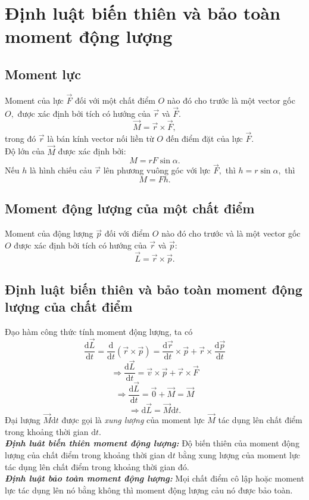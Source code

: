 \section{Định luật biến thiên và bảo toàn moment động lượng}
\subsection{Moment lực}
Moment của lực $\overrightarrow{F}$ đối với một chất điểm $O$ nào đó cho trước là một vector gốc $O,$ được xác định bởi tích có hướng của $\overrightarrow{r}$ và $\overrightarrow{F}.$ 
$$\overrightarrow{M} = \overrightarrow{r} \times \overrightarrow{F},$$
trong đó $\overrightarrow{r}$ là bán kính vector nối liền từ $O$ đến điểm đặt của lực $\overrightarrow{F}.$\\
Độ lớn của $\overrightarrow{M}$ được xác định bởi:
$$M = r F \sin \alpha.$$
Nếu $h$ là hình chiếu cảu $\overrightarrow{r}$ lên phương vuông góc với lực $\overrightarrow{F},$ thì $h = r \sin \alpha,$ thì
$$M = Fh.$$
\subsection{Moment động lượng của một chất điểm}
Moment của động lượng $\overrightarrow{p}$ đối với điểm $O$ nào đó cho trước và là một vector gốc $O$ được xác định bởi tích có hướng của $\overrightarrow{r}$ và $\overrightarrow{p}:$
$$ \overrightarrow{L} = \overrightarrow{r} \times \overrightarrow{p}.$$
\subsection{Định luật biến thiên và bảo toàn moment động lượng của chất điểm}
Đạo hàm công thức tính moment động lượng, ta có
$$\frac{{\mathrm{d} \overrightarrow L }}{\mathrm{d}t} = \frac{{\mathrm{d}}}{\mathrm{d}t}\left( {\overrightarrow r  \times  \overrightarrow p } \right) = \frac{{\mathrm{d}\overrightarrow r }}{\mathrm{d}t} \times \overrightarrow p  + \overrightarrow r  \times \frac{{\mathrm{d}\overrightarrow p }}{\mathrm{d}t}$$
$$ \Rightarrow \frac{{\mathrm{d}\overrightarrow L }}{\mathrm{d}t} = \overrightarrow v  \times \overrightarrow p  + \overrightarrow r  \times \overrightarrow F $$
$$ \Rightarrow \frac{{\mathrm{d}\overrightarrow L }}{\mathrm{d}t} = \overrightarrow 0  + \overrightarrow M  = \overrightarrow M $$
$$\Rightarrow \mathrm{d}\overrightarrow{L} = \overrightarrow{M}\mathrm{d}t.$$
Đại lượng $\overrightarrow{M}\mathrm{d}t$ được gọi là \textit{xung lượng} của moment lực $\overrightarrow{M}$ tác dụng lên chất điểm trong khoảng thời gian $\mathrm{d}t.$\\
\textbf{\textit{Định luât biến thiên moment động lượng:}} Độ biến thiên của moment động lượng của chất điểm trong khoảng thời gian $\mathrm{d}t$ bằng xung lượng của moment lực tác dụng lên chất điểm trong khoảng thời gian đó.\\
\textbf{\textit{Định luật bảo toàn moment động lượng:}} Mọi chất điểm cô lập hoặc moment lực tác dụng lên nó bằng không thì moment động lượng cảu nó được bảo toàn.
